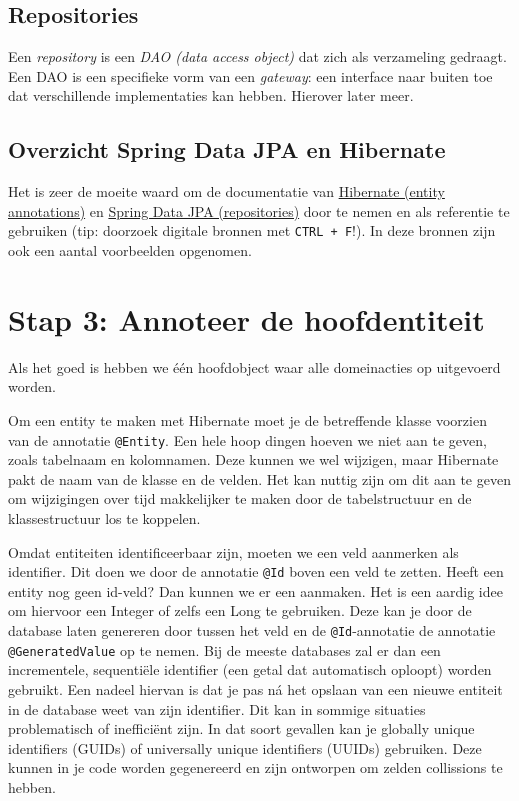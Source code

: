 \subsection{Repositories}
Een \textit{repository} is een \textit{DAO (data access object)} 
dat zich als verzameling gedraagt. 
Een DAO is een specifieke vorm van een \textit{gateway}: 
een interface naar buiten toe dat verschillende implementaties kan hebben.
Hierover later meer.

\subsection{Overzicht Spring Data JPA en Hibernate}
Het is zeer de moeite waard om de documentatie van 
\href{https://docs.jboss.org/hibernate/stable/annotations/reference/en/html_single/#entity-overview}{Hibernate (entity annotations)}
en 
\href{https://docs.spring.io/spring-data/jpa/docs/current/reference/html/#repositories}{Spring Data JPA (repositories)}
door te nemen en als referentie te gebruiken (tip: doorzoek digitale bronnen met \texttt{CTRL + F}!). 
In deze bronnen zijn ook een aantal voorbeelden opgenomen.

\newpage
\section{Stap 3: Annoteer de hoofdentiteit}
Als het goed is hebben we één hoofdobject waar alle domeinacties
op uitgevoerd worden.

Om een entity te maken met Hibernate moet 
je de betreffende klasse voorzien van de 
annotatie \texttt{@Entity}. Een hele hoop dingen 
hoeven we niet aan te geven, zoals tabelnaam en kolomnamen.
Deze kunnen we wel wijzigen, maar Hibernate pakt de naam 
van de klasse en de velden. Het kan nuttig zijn om dit aan 
te geven om wijzigingen over tijd makkelijker te maken door
de tabelstructuur en de klassestructuur los te koppelen.

Omdat entiteiten
identificeerbaar zijn, moeten we een veld 
aanmerken als identifier. Dit doen we door de annotatie 
\texttt{@Id} boven een veld te zetten. Heeft een entity
nog geen id-veld? Dan kunnen we er een aanmaken. Het is 
een aardig idee om hiervoor een Integer of zelfs een Long 
te gebruiken. Deze kan je door de database laten genereren 
door tussen het veld en de \texttt{@Id}-annotatie 
de annotatie \texttt{@GeneratedValue} op te nemen. 
Bij de meeste databases zal er dan een incrementele, 
sequentiële identifier (een getal dat automatisch oploopt) 
worden gebruikt. Een nadeel hiervan is dat je pas ná het opslaan 
van een nieuwe entiteit in de database weet van zijn identifier. 
Dit kan in sommige situaties problematisch of inefficiënt zijn.
In dat soort gevallen kan je globally unique identifiers (GUIDs)
of universally unique identifiers (UUIDs) gebruiken. Deze kunnen 
in je code worden gegenereerd en zijn ontworpen om zelden collissions
te hebben.

